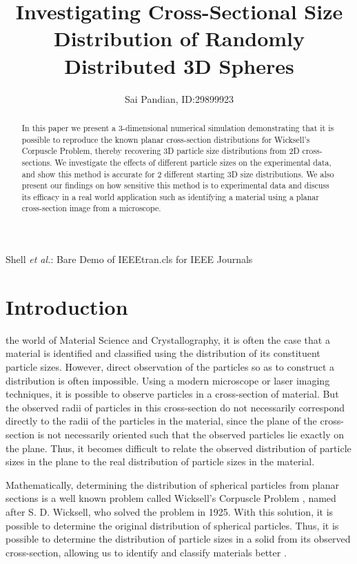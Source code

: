 \documentclass[journal]{IEEEtran}
\begin{document}
\title{Investigating Cross-Sectional Size Distribution of Randomly Distributed
       3D Spheres} 

\author{Sai Pandian, ID:\@ 29899923}%
        
{Shell \MakeLowercase{\textit{et al.}}: Bare Demo of IEEEtran.cls for IEEE Journals}

\maketitle

\begin{abstract}
  In this paper we present a 3-dimensional numerical simulation demonstrating
  that it is possible to reproduce the known planar cross-section distributions
  for Wicksell's Corpuscle Problem, thereby recovering 3D particle size
  distributions from 2D cross-sections. We investigate the effects of different
  particle sizes on the experimental data, and show this method is accurate for
  2 different starting 3D size distributions. We also present our findings on
  how sensitive this method is to experimental data and discuss its efficacy in
  a real world application such as identifying a material using a planar
  cross-section image from a microscope.
\end{abstract}

\section{Introduction}

 the world of Material Science and Crystallography, it is
often the case that a material is identified and classified using the
distribution of its constituent particle sizes. However, direct observation of
the particles so as to construct a distribution is often impossible. Using a
modern microscope or laser imaging techniques, it is possible to observe
particles in a cross-section of material. But the observed radii of particles in
this cross-section do not necessarily correspond directly to the radii of the
particles in the material, since the plane of the cross-section is not
necessarily oriented such that the observed particles lie exactly on the
plane. Thus, it becomes difficult to relate the observed distribution of
particle sizes in the plane to the real distribution of particle sizes in the
material.

Mathematically, determining the distribution of spherical particles from planar
sections is a well known problem called Wicksell's Corpuscle Problem
\cite{DWicksell}, named after S. D. Wicksell, who solved the problem in 1925. With
this solution, it is possible to determine the original distribution of
spherical particles. Thus, it is possible to determine the distribution of
particle sizes in a solid from its observed cross-section, allowing us to
identify and classify materials better \cite{Cuzzi2016}.
\end{document}
